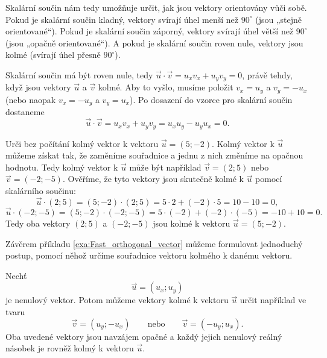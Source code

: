 Skalární součin nám tedy umožňuje určit, jak jsou vektory orientovány vůči sobě.
Pokud je skalární součin kladný, vektory svírají úhel menší než $90^\circ$ (jsou „stejně orientované“).
Pokud je skalární součin záporný, vektory svírají úhel větší než $90^\circ$ (jsou „opačně orientované“).
A pokud je skalární součin roven nule, vektory jsou kolmé (svírají úhel přesně $90^\circ$).

\begin{remark}\label{rem:Fast_orthogonal_vector}
    Skalární součin má být roven nule, tedy $\vec{u} \cdot \vec{v} = u_xv_x + u_yv_y = 0$, 
    právě tehdy, když jsou vektory $\vec{u}$ a $\vec{v}$ kolmé. Aby to vyšlo, musíme
    položit $v_x = u_y$ a $v_y = -u_x$ (nebo naopak $v_x = -u_y$ a $v_y = u_x$).
    Po dosazení do vzorce pro skalární součin dostaneme
    \[
    \vec{u} \cdot \vec{v} = u_xv_x + u_yv_y = u_xu_y - u_yu_x = 0.
    \]
\end{remark}


\begin{example}\label{exa:Fast_orthogonal_vector}
    Urči bez počítání kolmý vektor k vektoru $\vec{u} = (5; -2)$.
    Kolmý vektor k $\vec{u}$ můžeme získat tak, že zaměníme souřadnice a jednu z nich změníme na opačnou hodnotu.
    Tedy kolmý vektor k $\vec{u}$ může být například $\vec{v} = (2; 5)$ nebo $\vec{v} = (-2; -5)$.
    Ověříme, že tyto vektory jsou skutečně kolmé k $\vec{u}$ pomocí skalárního součinu:
    \[
    \vec{u} \cdot (2; 5) = (5; -2) \cdot (2; 5) = 5 \cdot 2 + (-2) \cdot 5 = 10 - 10 = 0,
    \]
    \[
    \vec{u} \cdot (-2; -5) = (5; -2) \cdot (-2; -5) = 5 \cdot (-2) + (-2) \cdot (-5) = -10 + 10 = 0.
    \]
    Tedy oba vektory $(2; 5)$ a $(-2; -5)$ jsou kolmé k vektoru $\vec{u} = (5; -2)$.
\end{example}

Závěrem příkladu \ref{exa:Fast_orthogonal_vector} můžeme formulovat
jednoduchý postup, pomocí něhož určíme souřadnice vektoru kolmého
k danému vektoru.

\begin{definition}\label{def:Fast_orthogonal_vector}
    Nechť
    \[
        \vec{u}=(u_x;u_y)
    \]
    je nenulový vektor. Potom můžeme vektory kolmé k vektoru
    $\vec{u}$ určit například ve tvaru
    \begin{equation}\label{eq:Fast_orthogonal_vector}
        \vec{v}=(u_y;-u_x)
        \qquad\text{nebo}\qquad
        \vec{v}=(-u_y;u_x).
    \end{equation}
    Oba uvedené vektory jsou navzájem opačné a každý jejich nenulový
    reálný násobek je rovněž kolmý k vektoru $\vec{u}$.
\end{definition}

